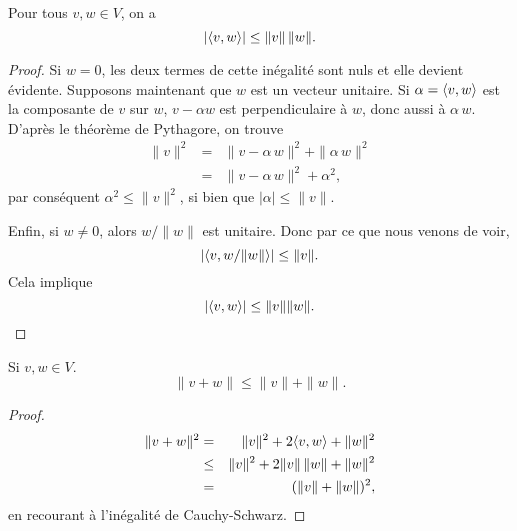 \begin{theorem}
  Pour tous $v,w \in V$, on a  
  \begin{displaymath}
    |\langle {v,w} \rangle| \leq \|v\| \, \|w\|.
  \end{displaymath}
\end{theorem}


\begin{proof}
  Si $w=0$, les deux termes de cette inégalité sont nuls et elle devient évidente. Supposons maintenant que $w$ est un vecteur unitaire. Si $\alpha = \langle {v,w} \rangle$ est la composante de $v$ sur $w$, $v - \alpha w$ est perpendiculaire à $w$, donc aussi à $\alpha\,w$. D'après le théorème de Pythagore, on trouve 
  \begin{eqnarray*}
    \|v\|^2 & = & \|v - \alpha \,w\|^2 + \|\alpha \, w \|^2 \\
           & = &  \|v - \alpha \,w\|^2 + \alpha^2,
  \end{eqnarray*}
par conséquent $\alpha^2 \leq \|v\|^2$, si bien que $|\alpha| \leq \|v\|$. 

Enfin, si $w \neq 0$, alors $w / \|w\|$ est unitaire. Donc par ce que nous venons de voir,
\begin{displaymath}
  \left| \langle {v, w / \|w\|} \rangle \right| \leq \|v\|.
\end{displaymath}
Cela implique 
\begin{displaymath}
   \left| \langle {v, w } \rangle \right| \leq \|v\| \|w\|.
\end{displaymath}
\end{proof}




\begin{theorem}
  \label{thr:1}
  Si $v,w \in V$. 
  \begin{displaymath}
    \|v+w\| \leq \|v\| + \|w\|. 
  \end{displaymath}
\end{theorem}


\begin{proof}
  \begin{eqnarray*}
    \|v+w\|^2 & =     & \|v\|^2 + 2 \langle {v,w} \rangle + \|w\|^2 \\
              & \leq & \|v\|^2 + 2 \|v\|\,\|w\| + \|w\|^2 \\
              & = & (\|v\| + \|w\|)^2,
  \end{eqnarray*}
en recourant à l'inégalité de Cauchy-Schwarz. 
\end{proof}


